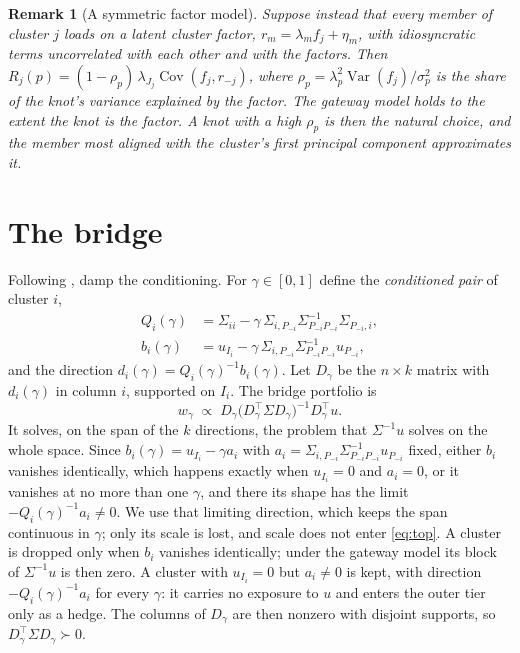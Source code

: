 \documentclass[11pt]{article}
\DeclareMathOperator{\Cov}{Cov}
\DeclareMathOperator{\Var}{Var}
\newtheorem{remark}{Remark}
\begin{document}
\begin{remark}[A symmetric factor model]
Suppose instead that every member of cluster $j$ loads on a latent cluster
factor, $r_m=\lambda_m f_j+\eta_m$, with idiosyncratic terms uncorrelated
with each other and with the factors. Then
$R_j(p)=(1-\rho_p)\,\lambda_{J_j}\Cov(f_j,r_{-j})$, where
$\rho_p=\lambda_p^2\Var(f_j)/\sigma_p^2$ is the share of the knot's variance
explained by the factor. The gateway model holds to the extent the knot is
the factor. A knot with a high $\rho_p$ is then the natural choice, and the
member most aligned with the cluster's first principal component
approximates it.
\end{remark}

\section{The bridge}

Following \cite{cotton2024schur}, damp the conditioning. For
$\gamma\in[0,1]$ define the \emph{conditioned pair} of cluster $i$,
\begin{equation}
\begin{aligned}
  Q_i(\gamma) &= \Sigma_{ii}-\gamma\,\Sigma_{i,P_{-i}}\Sigma_{P_{-i}P_{-i}}^{-1}\Sigma_{P_{-i},i},\\
  b_i(\gamma) &= u_{I_i}-\gamma\,\Sigma_{i,P_{-i}}\Sigma_{P_{-i}P_{-i}}^{-1}u_{P_{-i}},
\end{aligned}
  \label{eq:pair}
\end{equation}
and the direction $d_i(\gamma)=Q_i(\gamma)^{-1}b_i(\gamma)$. Let $D_\gamma$
be the $n\times k$ matrix with $d_i(\gamma)$ in column $i$, supported on
$I_i$. The bridge portfolio is
\begin{equation}
  w_\gamma \;\propto\; D_\gamma\big(D_\gamma^\top\Sigma D_\gamma\big)^{-1}D_\gamma^\top u .
  \label{eq:top}
\end{equation}
It solves, on the span of the $k$ directions, the problem that
$\Sigma^{-1}u$ solves on the whole space. Since $b_i(\gamma)=u_{I_i}-\gamma a_i$
with $a_i=\Sigma_{i,P_{-i}}\Sigma_{P_{-i}P_{-i}}^{-1}u_{P_{-i}}$ fixed, either
$b_i$ vanishes identically, which happens exactly when $u_{I_i}=0$ and
$a_i=0$, or it vanishes at no more than one $\gamma$, and there its shape
has the limit $-Q_i(\gamma)^{-1}a_i\neq0$. We use that limiting direction,
which keeps the span continuous in $\gamma$; only its scale is lost, and
scale does not enter \eqref{eq:top}. A cluster is dropped only when $b_i$
vanishes identically; under the gateway model its block of $\Sigma^{-1}u$
is then zero. A cluster with $u_{I_i}=0$ but $a_i\neq0$ is kept, with
direction $-Q_i(\gamma)^{-1}a_i$ for every $\gamma$: it carries no exposure
to $u$ and enters the outer tier only as a hedge. The columns of $D_\gamma$
are then nonzero with disjoint supports, so
$D_\gamma^\top\Sigma D_\gamma\succ0$.
\end{document}
